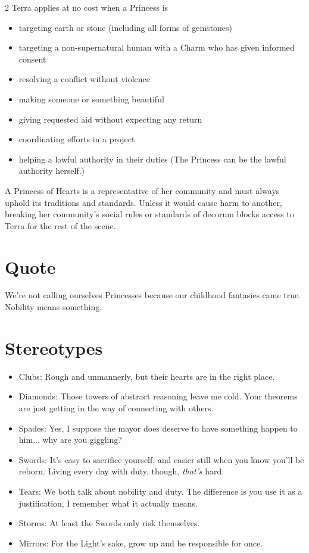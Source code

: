 \begin{multicols}{2}
Terra applies at no cost when a Princess is
\begin{itemize}
\item targeting earth or stone (including all forms of gemstones)
\item targeting a non-supernatural human with a Charm who has given informed consent
\item resolving a conflict without violence 
\item making someone or something beautiful
\item giving requested aid without expecting any return
\item coordinating efforts in a project
\item helping a lawful authority in their duties (The Princess can be the lawful authority herself.)
\end{itemize}

A Princess of Hearts is a representative of her community and must always uphold its traditions and standards. Unless it would cause harm to another, breaking her community's social rules or standards of decorum blocks access to Terra for the rest of the scene.

\section*{Quote}

We're not calling ourselves Princesses because our childhood fantasies came true. Nobility means something. 

\section*{Stereotypes}

\begin{itemize}
\item Clubs: Rough and unmannerly, but their hearts are in the right place.
\item Diamonds: Those towers of abstract reasoning leave me cold. Your theorems are just getting in the way of connecting with others.

\item Spades: Yes, I suppose the mayor does deserve to have something happen to him... why are you giggling?
\item Swords: It's easy to sacrifice yourself, and easier still when you know you'll be reborn. Living every day with duty, though, \textit{that's} hard.
\item Tears: We both talk about nobility and duty. The difference is you use it as a justification, I remember what it actually means. 
\item Storms: At least the Swords only risk themselves.
\item Mirrors: For the Light's sake, grow up and be responsible for once.


\end{itemize}
\end{multicols}
